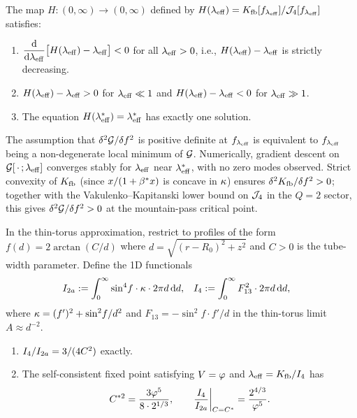 \begin{theorem}
\label{P2:thm:mono}
The map $H\colon(0,\infty)\to(0,\infty)$ defined by
$H(\lambda_{\mathrm{eff}}) = K_{\mathrm{fb}}[f_{\lambda_{\mathrm{eff}}}]/\mathcal{J}_4[f_{\lambda_{\mathrm{eff}}}]$
satisfies:
\begin{enumerate}[label=\textup{(\roman*)}]
  \item $\dfrac{\mathrm{d}}{\mathrm{d}\lambda_{\mathrm{eff}}}\bigl[H(\lambda_{\mathrm{eff}})-\lambda_{\mathrm{eff}}\bigr] < 0$
    for all $\lambda_{\mathrm{eff}}>0$, i.e., $H(\lambda_{\mathrm{eff}})-\lambda_{\mathrm{eff}}$ is strictly decreasing.
  \item $H(\lambda_{\mathrm{eff}})-\lambda_{\mathrm{eff}} > 0$ for $\lambda_{\mathrm{eff}} \ll 1$ and
    $H(\lambda_{\mathrm{eff}})-\lambda_{\mathrm{eff}} < 0$ for $\lambda_{\mathrm{eff}} \gg 1$.
  \item The equation $H(\lambda_{\mathrm{eff}}^*)=\lambda_{\mathrm{eff}}^*$ has exactly one solution.
\end{enumerate}
\end{theorem}

\begin{remark}
\label{P2:rem:nd}
The assumption that $\delta^2\mathcal{G}/\delta f^2$ is positive definite at
$f_{\lambda_{\mathrm{eff}}}$ is equivalent to $f_{\lambda_{\mathrm{eff}}}$ being a non-degenerate
local minimum of $\mathcal{G}$.
Numerically, gradient descent on $\mathcal{G}[\,\cdot\,;\lambda_{\mathrm{eff}}]$ converges
stably for $\lambda_{\mathrm{eff}}$ near $\lambda_{\mathrm{eff}}^*$, with no zero modes observed.
Strict convexity of $K_{\mathrm{fb}}$ (since $x/(1+\beta^{*} x)$ is concave in $\kappa$)
ensures $\delta^2K_{\mathrm{fb}}/\delta f^2 > 0$; together with the
Vakulenko--Kapitanski lower bound on $\mathcal{J}_4$ in the $Q=2$ sector,
this gives $\delta^2\mathcal{G}/\delta f^2 > 0$ at the mountain-pass critical point.
\end{remark}

\begin{theorem}
\label{P2:thm:lsl_1d}
In the thin-torus approximation, restrict to profiles of the form
$f(d) = 2\arctan(C/d)$ where $d = \sqrt{(r-R_0)^2+z^2}$ and $C>0$
is the tube-width parameter.  Define the 1D functionals
\begin{align}
  I_{2a}   &:= \int_0^\infty \sin^4\!f\cdot\kappa\cdot 2\pi d\,\mathrm{d}d,
  &
  I_{4}   &:= \int_0^\infty F_{13}^2\cdot 2\pi d\,\mathrm{d}d,
\end{align}
where $\kappa = (f')^2 + \sin^2\!f/d^2$ and $F_{13} = -\sin^2\!f\cdot f'/d$
in the thin-torus limit $A\approx d^{-2}$.

\begin{enumerate}[label=\textup{(\roman*)}]
\item $I_{4}/I_{2a} = 3/(4C^2)$ exactly.
\item The self-consistent fixed point satisfying $V=\varphi$ and
  $\lambda_{\mathrm{eff}} = K_{\mathrm{fb}}/I_{4}$ has
  \[
    C^{*2} = \frac{3\varphi^5}{8\cdot 2^{1/3}}, \qquad
    \frac{I_{4}}{I_{2a}}\bigg|_{C=C^*} = \frac{2^{4/3}}{\varphi^5}.
  \]
\end{enumerate}
\end{theorem}

